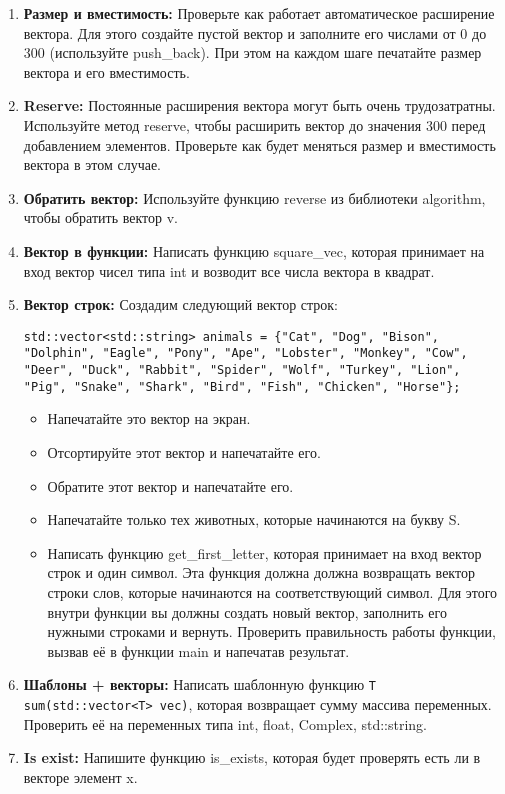 \documentclass{article}
\begin{document}
\begin{enumerate}
\item \textbf{Размер и вместимость:} Проверьте как работает автоматическое расширение вектора. Для этого создайте пустой вектор и заполните его числами от 0 до 300 (используйте push\_back). При этом на каждом шаге печатайте размер вектора и его вместимость.
\item \textbf{Reserve:} Постоянные расширения вектора могут быть очень трудозатратны. Используйте метод reserve, чтобы расширить вектор до значения 300 перед добавлением элементов. Проверьте как будет меняться размер и вместимость вектора в этом случае.
\item \textbf{Обратить вектор:} Используйте функцию reverse из библиотеки algorithm, чтобы обратить вектор v.
\item \textbf{Вектор в функции:} Написать функцию square\_vec, которая принимает на вход вектор чисел типа int и возводит все числа вектора в квадрат.

\item \textbf{Вектор строк:} Создадим следующий вектор строк:
\begin{lstlisting}
std::vector<std::string> animals = {"Cat", "Dog", "Bison", "Dolphin", "Eagle", "Pony", "Ape", "Lobster", "Monkey", "Cow", "Deer", "Duck", "Rabbit", "Spider", "Wolf", "Turkey", "Lion", "Pig", "Snake", "Shark", "Bird", "Fish", "Chicken", "Horse"};
\end{lstlisting}
\begin{itemize}
\item Напечатайте это вектор на экран.
\item Отсортируйте этот вектор и напечатайте его.
\item Обратите этот вектор и напечатайте его.
\item Напечатайте только тех животных, которые начинаются на букву S.
\item Написать функцию get\_first\_letter, которая принимает на вход вектор строк и один символ. Эта функция должна должна возвращать вектор строки слов, которые начинаются на соответствующий символ. Для этого внутри функции вы должны создать новый вектор, заполнить его нужными строками и вернуть. Проверить правильность работы функции, вызвав её в функции main и напечатав результат.
\end{itemize}
\item \textbf{Шаблоны + векторы:} Написать шаблонную функцию \texttt{T sum(std::vector<T> vec)}, которая возвращает сумму массива переменных. Проверить её на переменных типа int, float, Complex, std::string.
\item \textbf{Is exist:} Напишите функцию is\_exists, которая будет проверять есть ли в векторе элемент x.
\end{enumerate}
\end{document}
